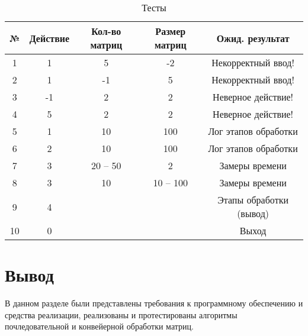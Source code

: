 \begin{table}[h]
	\begin{center}
		\caption{\label{test} Тесты}
		\begin{tabular}{|c|c|c|c|c|}
			\hline
			№ & Действие & Кол-во матриц & Размер матриц & Ожид. результат \\
			\hline
            1 & 1 & 5 & -2 & Некорректный ввод! \\
            \hline
            2 & 1 & -1 & 5 & Некорректный ввод! \\
            \hline
            3 & -1 & 2 & 2 & Неверное действие! \\
            \hline
            4 & 5 & 2 & 2 & Неверное действие! \\
		\hline
		5 & 1 & 10 & 100 & Лог этапов обработки \\
		\hline
            6 & 2 & 10 & 100 & Лог этапов обработки \\
		\hline
            7 & 3 & 20 -- 50 & 2 & Замеры времени \\
		\hline
            8 & 3 & 10 & 10 -- 100 & Замеры времени \\
		\hline
            9 & 4 &  &  & Этапы обработки (вывод)\\
		\hline
            10 & 0 &  &  & Выход\\
		\hline
		\end{tabular}
	\end{center}
\end{table}
\captionsetup{singlelinecheck = false, justification=centering}

\section*{Вывод}
В данном разделе были представлены требования к программному обеспечению и средства реализации, реализованы и протестированы алгоритмы почледовательной и конвейерной обработки матриц.


